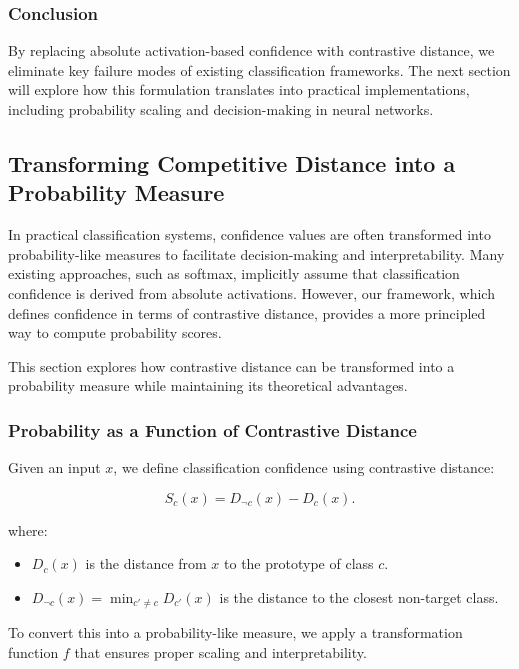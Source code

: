 \documentclass[12pt]{article}
\begin{document}
\subsubsection{Conclusion}

By replacing absolute activation-based confidence with contrastive distance, we eliminate key failure modes of existing classification frameworks. The next section will explore how this formulation translates into practical implementations, including probability scaling and decision-making in neural networks.

\subsection{Transforming Competitive Distance into a Probability Measure}

In practical classification systems, confidence values are often transformed into probability-like measures to facilitate decision-making and interpretability. Many existing approaches, such as softmax, implicitly assume that classification confidence is derived from absolute activations. However, our framework, which defines confidence in terms of contrastive distance, provides a more principled way to compute probability scores.

This section explores how contrastive distance can be transformed into a probability measure while maintaining its theoretical advantages.

\subsubsection{Probability as a Function of Contrastive Distance}

Given an input \( x \), we define classification confidence using contrastive distance:

\[
S_c(x) = D_{\neg c}(x) - D_c(x).
\]

where:

\begin{itemize}
    \item \( D_c(x) \) is the distance from \( x \) to the prototype of class \( c \).
    \item \( D_{\neg c}(x) = \min_{c' \neq c} D_{c'}(x) \) is the distance to the closest non-target class.
\end{itemize}

To convert this into a probability-like measure, we apply a transformation function \( f \) that ensures proper scaling and interpretability.
\end{document}
